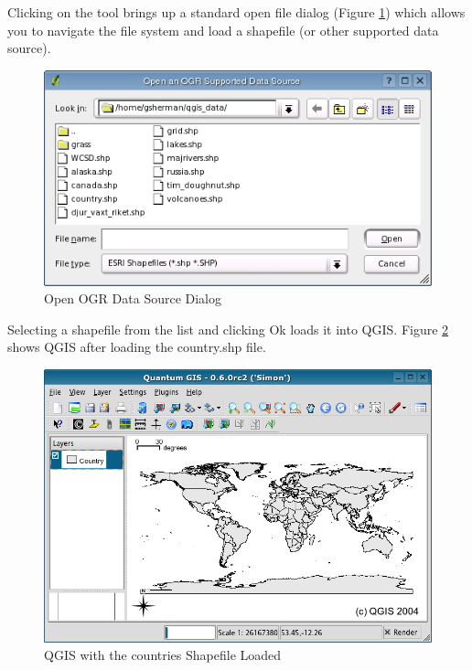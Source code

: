 \documentclass[10pt,english]{article}
\begin{document}
\begin{onehalfspace}
Clicking on the tool brings up a standard open file dialog (Figure \ref{fig:openshapefile}) which allows you to navigate the file system and load a shapefile (or other supported data source). 
\begin{figure}[h]
   \begin{center}
   \caption{Open OGR Data Source Dialog}\label{fig:openshapefile}\smallskip
   \includegraphics[scale=.75]{qgis_user_guide_images/shapefileopendialog}
\end{center}  
   
\end{figure}
Selecting a shapefile from the list and clicking Ok loads it into QGIS. Figure \ref{fig:loadedshapefile}
shows QGIS after loading the country.shp file.
\begin{figure}[h]
   \begin{center}
   \caption{QGIS with the countries Shapefile Loaded}\label{fig:loadedshapefile}\smallskip
   \includegraphics[scale=.6]{qgis_user_guide_images/shapefileloaded}
\end{center}  
   

\end{figure}
\end{onehalfspace}
\end{document}
